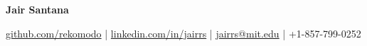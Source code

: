 \documentclass[a4paper,10pt]{article}
\makeatletter
\newcommand{\name}{Jair Santana}
\newcommand{\phone}{+1-857-799-0252}
\newcommand{\emaila}{jairrs@mit.edu}
\newcommand{\github}{rekomodo}
\newcommand{\linkedin}{jairrs}
\makeatother
\begin{document}
\selectfont

\begin{center}
    \LARGE{\textbf{\name}}
\end{center}
\vspace{-4.5mm}
\begin{center}
    \small{\href{https://github.com/\github}{\faGithub \hspace{0.2mm} github.com/\github} | \href{https://www.linkedin.com/in/\linkedin/}{\faLinkedinSquare \hspace{0.2mm} linkedin.com/in/\linkedin} | \href{mailto:\emaila}{\faSend \hspace{0.2mm} \emaila} | \faPhone \hspace{0.2mm} \phone}
\end{center}
\vspace{-3mm}






%
\end{document}
